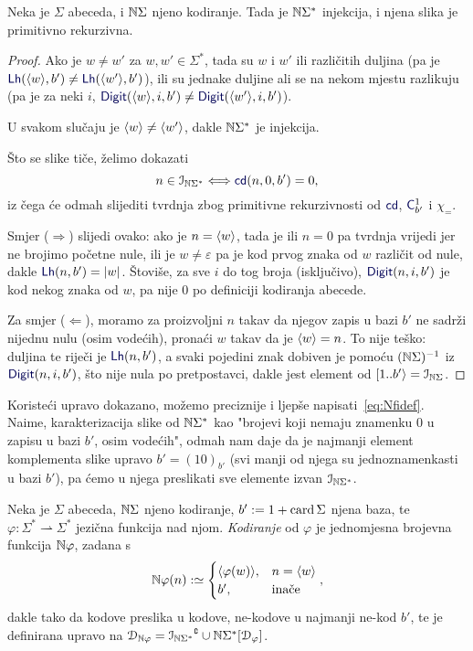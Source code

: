 \begin{propozicija}
Neka je $\Sigma$ abeceda, i ${\mathbb N}\Sigma$ njeno kodiranje. Tada je ${\mathbb N}\Sigma^*$ injekcija, i njena slika je primitivno rekurzivna.
\end{propozicija}
\begin{proof}
Ako je $w\not=w'$ za $w,w'\in\Sigma^*$, tada su $w$ i $w'$ ili različitih duljina (pa je $\f{Lh}(\kr w,b')\not=\f{Lh}(\kr{w'},b')$), ili su jednake duljine ali se na nekom mjestu razlikuju (pa je za neki $i$, $\f{Digit}(\kr w,i,b')\not=\f{Digit}(\kr{w'},i,b')$).

U svakom slučaju je $\langle w\rangle\not=\langle w'\rangle$, dakle ${\mathbb N}\Sigma^*$ je injekcija.

Što se slike tiče, želimo dokazati
\begin{equation}\label{eq:imNSzprn}
    n\in\im{\N\Sigma^*}\Longleftrightarrow\f{cd}(n,0,b')=0\text,
\end{equation}
iz čega će odmah slijediti tvrdnja zbog primitivne rekurzivnosti od $\f{cd}$, $\f C_{b'}^1$ i $\chi_=$.

Smjer ($\Rightarrow$) slijedi ovako: ako je $n=\langle w\rangle$, tada je ili $n=0$ pa tvrdnja vrijedi jer ne brojimo početne nule, ili je $w\not=\varepsilon$ pa je kod prvog znaka od $w$ različit od nule, dakle $\f{Lh}(n,b')=\left|w\right|$. Štoviše, za sve $i$ do tog broja (isključivo), $\f{Digit}(n,i,b')$ je kod nekog znaka od $w$, pa nije $0$ po definiciji kodiranja abecede.

Za smjer ($\Leftarrow$), moramo za proizvoljni $n$ takav da njegov zapis u bazi $b'$ ne sadrži nijednu nulu (osim vodećih), pronaći $w$ takav da je $\langle w\rangle=n$. To nije teško: duljina te riječi je $\f{Lh}(n,b')$, a svaki pojedini znak dobiven je pomoću $({\mathbb N}\Sigma)^{-1}$ iz $\f{Digit}(n,i,b')$, što nije nula po pretpostavci, dakle jest element od $[1..b'\rangle=\mathcal I_{{\mathbb N}\Sigma}$.
\end{proof}

Koristeći upravo dokazano, možemo preciznije i ljepše napisati~\eqref{eq:Nfidef}. Naime, karakterizacija slike od ${\mathbb N}\Sigma^*$ kao "brojevi koji nemaju znamenku $0$ u zapisu u bazi $b'$, osim vodećih", odmah nam daje da je najmanji element komplementa slike upravo $b'=(10)_{b'}$ (svi manji od njega su jednoznamenkasti u bazi $b'$), pa ćemo u njega preslikati sve elemente izvan $\mathcal I_{{\mathbb N}\Sigma^*}$.

\begin{definicija}\label{def:kodfi}
Neka je $\Sigma$ abeceda, ${\mathbb N}\Sigma$ njeno kodiranje, $b':=1+\operatorname{card}\Sigma$ njena baza, te $\varphi\colon\Sigma^*\rightharpoonup\Sigma^*$ jezična funkcija nad njom. \emph{Kodiranje} od $\varphi$ je jednomjesna brojevna funkcija ${\mathbb N}\varphi$, zadana s
\begin{equation}\label{eq:kodfidef}
    {\mathbb N}\varphi(n):\simeq\begin{cases}
    \langle\varphi(w)\rangle,&n=\langle w\rangle\\
    b',&\text{inače}
    \end{cases}\text,
\end{equation}
dakle tako da kodove preslika u kodove, ne-kodove u najmanji ne-kod $b'$, te je definirana upravo na $\mathcal D_{{\mathbb N}\varphi}={\mathcal I_{{\mathbb N}\Sigma^*}}\sp{{\scriptscriptstyle\complement}}\cup{\mathbb N}\Sigma^*[\mathcal D_{\varphi}]$.
\end{definicija}

